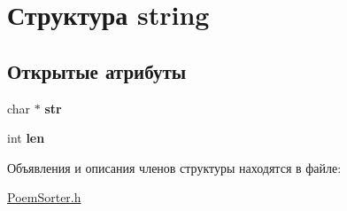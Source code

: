 \hypertarget{structstring}{}\section{Структура string}
\label{structstring}
\subsection*{Открытые атрибуты}
\begin{DoxyCompactItemize}
\item 
\mbox{\label{structstring_a29a7f93a22a1825df1f0586581c02278}} 
char $\ast$ {\bfseries str}
\item 
\mbox{\label{structstring_a3a4411e06b81944a7b94a744adaa4d15}} 
int {\bfseries len}
\end{DoxyCompactItemize}


Объявления и описания членов структуры находятся в файле\+:\begin{DoxyCompactItemize}
\item 
\hyperlink{PoemSorter_8h}{Poem\+Sorter.\+h}\end{DoxyCompactItemize}
